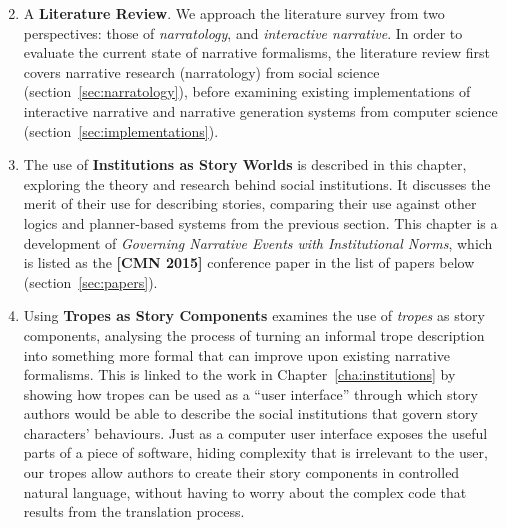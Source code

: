 \documentclass[11pt]{report}
\begin{document}
\begin{enumerate}[{Chapter} 1:]
\setcounter{enumi}{1}
\item A \textbf{Literature Review}.
  We approach the literature survey from two perspectives: those of \emph{narratology},
  and \emph{interactive narrative}.
  In order to evaluate the current state of narrative formalisms, the literature review first covers narrative research
  (narratology) from social science (section~\ref{sec:narratology}), before
  examining existing implementations of interactive narrative and narrative
  generation systems from computer science
  (section~\ref{sec:implementations}).
\item The use of \textbf{Institutions as Story Worlds} is described in
  this chapter, exploring the theory and research behind
  social institutions. It discusses the merit of their use for describing
  stories, comparing their use against other logics and planner-based systems
  from the previous section. This chapter is a development of \emph{Governing
    Narrative Events with Institutional Norms}, which is listed as
  the \textbf{[CMN 2015]} conference paper in the list of papers below (section~\ref{sec:papers}).
\item Using \textbf{Tropes as Story Components}
  examines the use of \emph{tropes} as story components, analysing the process
  of turning an informal trope description into something more formal that can improve
  upon existing narrative formalisms. This is linked to the work in
  Chapter~\ref{cha:institutions} by showing how tropes can be used as a
  ``user interface'' through which story authors would be able to
  describe the social institutions that govern story characters' behaviours.
  Just as a computer user interface exposes the useful parts of a piece of
  software, hiding complexity that is irrelevant to the user, our tropes allow
  authors to create their story components in controlled natural language,
  without having to worry about the complex code that results from the
  translation process.

\end{enumerate}
\end{document}
